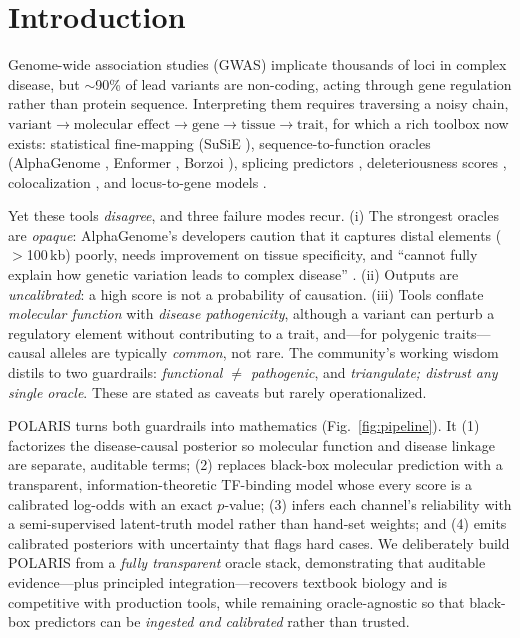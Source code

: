\documentclass[10pt]{article}
\begin{document}
\section{Introduction}
Genome-wide association studies (GWAS) implicate thousands of loci in complex disease, but
$\sim$90\% of lead variants are non-coding, acting through gene regulation rather than protein
sequence. Interpreting them requires traversing a noisy chain,
$\text{variant}\!\rightarrow\!\text{molecular effect}\!\rightarrow\!\text{gene}\!\rightarrow\!\text{tissue}\!\rightarrow\!\text{trait}$,
for which a rich toolbox now exists: statistical fine-mapping (SuSiE \citep{wang2020susie,zou2022susierss}),
sequence-to-function oracles (AlphaGenome \citep{avsec2025alphagenome}, Enformer \citep{avsec2021enformer},
Borzoi \citep{linder2025borzoi}), splicing predictors \citep{jaganathan2019spliceai,zeng2022pangolin},
deleteriousness scores \citep{rentzsch2021cadd}, colocalization \citep{giambartolomei2014coloc,wallace2021colocsusie},
and locus-to-gene models \citep{mountjoy2021l2g,gazal2022cs2g,flames2025}.

Yet these tools \emph{disagree}, and three failure modes recur. (i) The strongest oracles are
\emph{opaque}: AlphaGenome's developers caution that it captures distal elements ($>$100\,kb) poorly,
needs improvement on tissue specificity, and ``cannot fully explain how genetic variation leads to
complex disease'' \citep{avsec2025alphagenome}. (ii) Outputs are \emph{uncalibrated}: a high score is
not a probability of causation. (iii) Tools conflate \emph{molecular function} with \emph{disease
pathogenicity}, although a variant can perturb a regulatory element without contributing to a trait,
and---for polygenic traits---causal alleles are typically \emph{common}, not rare. The community's
working wisdom distils to two guardrails: \emph{functional $\neq$ pathogenic}, and \emph{triangulate;
distrust any single oracle}. These are stated as caveats but rarely operationalized.

POLARIS turns both guardrails into mathematics (Fig.~\ref{fig:pipeline}). It (1) factorizes the
disease-causal posterior so molecular function and disease linkage are separate, auditable terms;
(2) replaces black-box molecular prediction with a transparent, information-theoretic TF-binding
model whose every score is a calibrated log-odds with an exact $p$-value; (3) infers each channel's
reliability with a semi-supervised latent-truth model rather than hand-set weights; and (4) emits
calibrated posteriors with uncertainty that flags hard cases. We deliberately build POLARIS from a
\emph{fully transparent} oracle stack, demonstrating that auditable evidence---plus principled
integration---recovers textbook biology and is competitive with production tools, while remaining
oracle-agnostic so that black-box predictors can be \emph{ingested and calibrated} rather than trusted.
\end{document}
